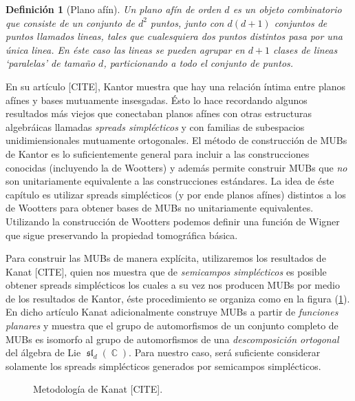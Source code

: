 \documentclass[a4paper]{report}
\DeclareMathOperator{\C}{\mathbb{C}}
\DeclareMathOperator{\Sl}{\mathfrak{sl}}
\newtheorem{definition}{Definición}
\begin{document}
  \begin{definition}[Plano afín]
    Un plano afín de orden $d$ es un objeto combinatorio que
    consiste de un conjunto de $d^2$ puntos, junto con
    $d(d+1)$ conjuntos de puntos llamados \textit{lineas},
    tales que cualesquiera dos puntos distintos pasa por una
    única linea. En éste caso las lineas se pueden agrupar
    en $d+1$ clases de lineas `paralelas' de tamaño $d$,
    particionando a todo el conjunto de puntos. 
  \end{definition}

  En su artículo [CITE], Kantor muestra que hay una relación
  íntima entre planos afínes y bases mutuamente insesgadas.
  Ésto lo hace recordando algunos resultados más viejos que
  conectaban planos afínes con otras estructuras algebráicas
  llamadas \textit{spreads simplécticos} y con familias de
  subespacios unidimiensionales mutuamente ortogonales.  El
  método de construcción de MUBs de Kantor es lo
  suficientemente general para incluir a las construcciones
  conocidas (incluyendo la de Wootters) y además permite
  construir MUBs que \textit{no} son unitariamente
  equivalente a las construcciones estándares. La idea de
  éste capítulo es utilizar spreads simplécticos (y por ende
  planos afínes) distintos a los de Wootters para obtener
  bases de MUBs no unitariamente equivalentes. Utilizando la
  construcción de Wootters podemos definir una función de
  Wigner que sigue preservando la propiedad tomográfica
  básica. 

  Para construir las MUBs de manera explícita, utilizaremos
  los resultados de Kanat [CITE], quien nos muestra que de
  \textit{semicampos simplécticos} es posible obtener
  spreads simplécticos los cuales a su vez nos producen MUBs
  por medio de los resultados de Kantor, éste procedimiento
  se organiza como en la figura (\ref{diag:kanat}).  En
  dicho artículo Kanat adicionalmente construye MUBs a
  partir de \textit{funciones planares} y muestra que el
  grupo de automorfismos de un conjunto completo de MUBs es
  isomorfo al grupo de automorfismos de una
  \textit{descomposición ortogonal} del álgebra de Lie
  $\Sl_d(\C)$. Para nuestro caso, será suficiente considerar
  solamente los spreads simplécticos generados por
  semicampos simplécticos.

  \begin{figure}[h]
    \centering
    \caption{Metodología de Kanat [CITE].}
    \label{diag:kanat}
  \end{figure}
\end{document}
